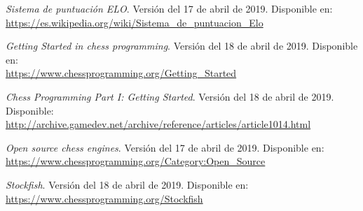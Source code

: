 \documentclass[letterpaper,12pt]{article}
\begin{document}
\begin{thebibliography}{99}
\textit{Sistema de puntuación ELO}. Versión del 17 de abril de 2019. Disponible en: \\
\url{https://es.wikipedia.org/wiki/Sistema_de_puntuacion_Elo}

\textit{Getting Started in chess programming}. Versión del 18 de abril de 2019. 
Disponible en: \\
\url{https://www.chessprogramming.org/Getting_Started}

\textit{Chess Programming Part I: Getting Started}. Versión del 18 de abril de 2019. 
Disponible: \\
\url{http://archive.gamedev.net/archive/reference/articles/article1014.html}


\textit{Open source chess engines}. Versión del 17 de abril de 2019. Disponible en: \\
\url{https://www.chessprogramming.org/Category:Open_Source}

\textit{Stockfish}. Versión del 18 de abril de 2019. Disponible en: \\
\url{https://www.chessprogramming.org/Stockfish}

\end{thebibliography}
\end{document}
